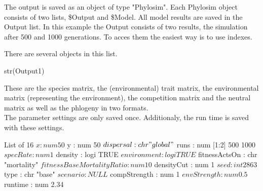 \documentclass [a4paper]{tufte-book}\usepackage[]{graphicx}\usepackage[]{color}
\begin{document}
The output is saved as an object of type "Phylosim".
Each Phylosim object consists of two lists, \$Output and \$Model.
All model results are saved in the Output list. In this example the
Output consists of two results, the simulation after 500 and 1000 generations.
To acces them the easiest way is to use indexes.
\begin{Schunk}
\end{Schunk}
There are several objects in this list.
\begin{Schunk}
\begin{Sinput}
str(Output1)
\end{Sinput}
\end{Schunk}
These are the species matrix, the (environmental) trait matrix, the environmental matrix (representing the environment), the competition matrix and the neutral matrix as well as the phlogeny in two formats.\\
The parameter settings are only saved once. Additionaly, the run time is saved with these settings.
\begin{Schunk}
\begin{Soutput}
List of 16
 $ x                        : num 50
 $ y                        : num 50
 $ dispersal                : chr "global"
 $ runs                     : num [1:2] 500 1000
 $ specRate                 : num 1
 $ density                  : logi TRUE
 $ environment              : logi TRUE
 $ fitnessActsOn            : chr "mortality"
 $ fitnessBaseMortalityRatio: num 10
 $ densityCut               : num 1
 $ seed                     : int 2863
 $ type                     : chr "base"
 $ scenario                 : NULL
 $ compStrength             : num 1
 $ envStrength              : num 0.5
 $ runtime                  : num 2.34
\end{Soutput}
\end{Schunk}
\end{document}
